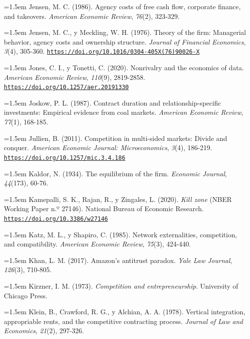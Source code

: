 \documentclass[10pt,a4paper]{article}
\begin{document}
\noindent\hangindent=1.5em Jensen, M. C. (1986). Agency costs of free cash flow, corporate finance, and takeovers. \textit{American Economic Review}, \textit{76}(2), 323-329.

\noindent\hangindent=1.5em Jensen, M. C., y Meckling, W. H. (1976). Theory of the firm: Managerial behavior, agency costs and ownership structure. \textit{Journal of Financial Economics}, \textit{3}(4), 305-360. \href{https://doi.org/10.1016/0304-405X(76)90026-X}{\nolinkurl{https://doi.org/10.1016/0304-405X(76)90026-X}}

\noindent\hangindent=1.5em Jones, C. I., y Tonetti, C. (2020). Nonrivalry and the economics of data. \textit{American Economic Review}, \textit{110}(9), 2819-2858. \href{https://doi.org/10.1257/aer.20191330}{\nolinkurl{https://doi.org/10.1257/aer.20191330}}

\noindent\hangindent=1.5em Joskow, P. L. (1987). Contract duration and relationship-specific investments: Empirical evidence from coal markets. \textit{American Economic Review}, \textit{77}(1), 168-185.

\noindent\hangindent=1.5em Jullien, B. (2011). Competition in multi-sided markets: Divide and conquer. \textit{American Economic Journal: Microeconomics}, \textit{3}(4), 186-219. \href{https://doi.org/10.1257/mic.3.4.186}{\nolinkurl{https://doi.org/10.1257/mic.3.4.186}}

\noindent\hangindent=1.5em Kaldor, N. (1934). The equilibrium of the firm. \textit{Economic Journal}, \textit{44}(173), 60-76.

\noindent\hangindent=1.5em Kamepalli, S. K., Rajan, R., y Zingales, L. (2020). \textit{Kill zone} (NBER Working Paper n.º 27146). National Bureau of Economic Research. \href{https://doi.org/10.3386/w27146}{\nolinkurl{https://doi.org/10.3386/w27146}}

\noindent\hangindent=1.5em Katz, M. L., y Shapiro, C. (1985). Network externalities, competition, and compatibility. \textit{American Economic Review}, \textit{75}(3), 424-440.

\noindent\hangindent=1.5em Khan, L. M. (2017). Amazon's antitrust paradox. \textit{Yale Law Journal}, \textit{126}(3), 710-805.

\noindent\hangindent=1.5em Kirzner, I. M. (1973). \textit{Competition and entrepreneurship}. University of Chicago Press.

\noindent\hangindent=1.5em Klein, B., Crawford, R. G., y Alchian, A. A. (1978). Vertical integration, appropriable rents, and the competitive contracting process. \textit{Journal of Law and Economics}, \textit{21}(2), 297-326.
\end{document}
